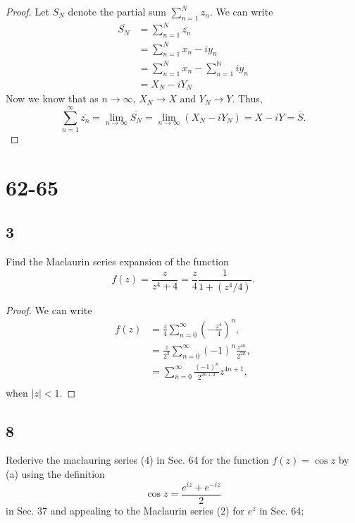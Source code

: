 \documentclass{article}
\newcommand{\N}{\mathbb{N}}
\begin{document}
\begin{proof}
    Let $S_N$ denote the partial sum $\sum_{n=1}^N z_n$. We can write
    \begin{align*}
        \overline{S_N} & = \sum_{n=1}^N \overline{z_n}            \\
                       & = \sum_{n=1}^N x_n - iy_n                \\
                       & =  \sum_{n=1}^N x_n - \sum_{n=1}^\N iy_n \\
                       & = X_N - iY_N
    \end{align*}
    Now we know that as $n\rightarrow\infty$, $X_N\rightarrow X$ and
    $Y_N\rightarrow Y$. Thus,
    \begin{equation*}
        \sum_{n=1}^\infty \overline{z_n} =
        \lim_{n\rightarrow\infty} \overline{S_N} =
        \lim_{n\rightarrow\infty} (X_N - iY_N) = X - iY = \overline{S}.
    \end{equation*}
\end{proof}

\section*{62-65}
\subsection*{3} %
Find the Maclaurin series expansion of the function
\begin{equation*}
    f(z) = \frac{z}{z^4 + 4} = \frac{z}{4}\frac{1}{1 + (z^4/4)}.
\end{equation*}

\begin{proof}
    We can write
    \begin{align*}
        f(z) & = \frac{z}{4}\sum_{n=0}^\infty (-\frac{z^4}{4})^n,                \\
             & = \frac{z}{2^2} \sum_{n = 0}^\infty (-1)^n \frac{z^{4n}}{2^{2n}}, \\
             & = \sum_{n=0}^\infty \frac{(-1)^n}{2^{2n + 2}}z^{4n+1},            \\
    \end{align*}
    when $|z| < 1$.
\end{proof}

\subsection*{8}
Rederive the maclauring series (4) in Sec. 64 for the function $f(z) = \cos z$ by
(a) using the definition \[\cos z = \frac{e^{iz} + e^{-iz}}{2}\] in Sec. 37
and appealing to the Maclaurin series (2) for $e^z$ in Sec. 64;
\end{document}
